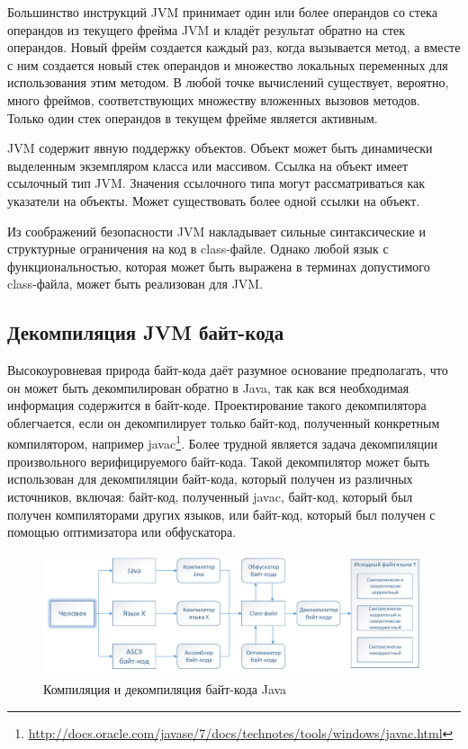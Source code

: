 \documentclass[14pt]{extarticle}
\begin{document}
Большинство инструкций JVM принимает один или более операндов со стека операндов из текущего фрейма JVM и кладёт результат обратно на стек операндов. Новый фрейм создается каждый раз, когда вызывается метод, а вместе с ним создается новый стек операндов и множество локальных переменных для использования этим методом. В любой точке вычислений существует, вероятно, много фреймов, соответствующих множеству вложенных вызовов методов. Только один стек операндов в текущем фрейме является активным.

JVM содержит явную поддержку объектов. Объект может быть динамически выделенным экземпляром класса или массивом. Ссылка на объект имеет ссылочный тип JVM. Значения ссылочного типа могут рассматриваться как указатели на объекты. Может существовать более одной ссылки на объект\cite{jvm}.

\pagebreak

Из соображений безопасности JVM накладывает сильные синтаксические и структурные ограничения на код в class-файле. Однако любой язык с функциональностью, которая может быть выражена в терминах допустимого class-файла, может быть реализован для JVM. 

\subsection{Декомпиляция JVM байт-кода}
Высокоуровневая природа байт-кода даёт разумное основание предполагать, что он может быть декомпилирован обратно в Java, так как вся необходимая информация содержится в байт-коде. Проектирование такого декомпилятора облегчается, если он декомпилирует только байт-код, полученный конкретным компилятором, например javac\footnote{\url{http://docs.oracle.com/javase/7/docs/technotes/tools/windows/javac.html}}. Более трудной является задача декомпиляции произвольного верифицируемого байт-кода. Такой декомпилятор может быть использован для декомпиляции байт-кода, который получен из различных источников, включая: байт-код, полученный javac,  байт-код, который был получен компиляторами других языков, или байт-код, который был получен с помощью оптимизатора или обфускатора\cite{bytecode}.

\begin{figure}[H]
\includegraphics[width=1\linewidth]{c_d.pdf}
\caption{Компиляция и декомпиляция байт-кода Java}
\end{figure}
\end{document}
